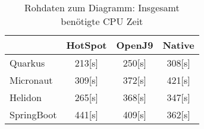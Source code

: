 \begin{table}[h]
    \centering
    \begin{tabular}{l|ccc}
        \hline
        & HotSpot & OpenJ9 & Native \\
        \hline
        Quarkus & 213[s] & 250[s] & 308[s] \\
        Micronaut & 309[s] & 372[s] & 421[s] \\
        Helidon & 265[s] & 368[s] & 347[s] \\
        SpringBoot & 441[s] & 409[s] & 362[s] \\
        \hline
    \end{tabular}
    \caption{Rohdaten zum Diagramm: Insgesamt benötigte CPU Zeit}
\end{table}
